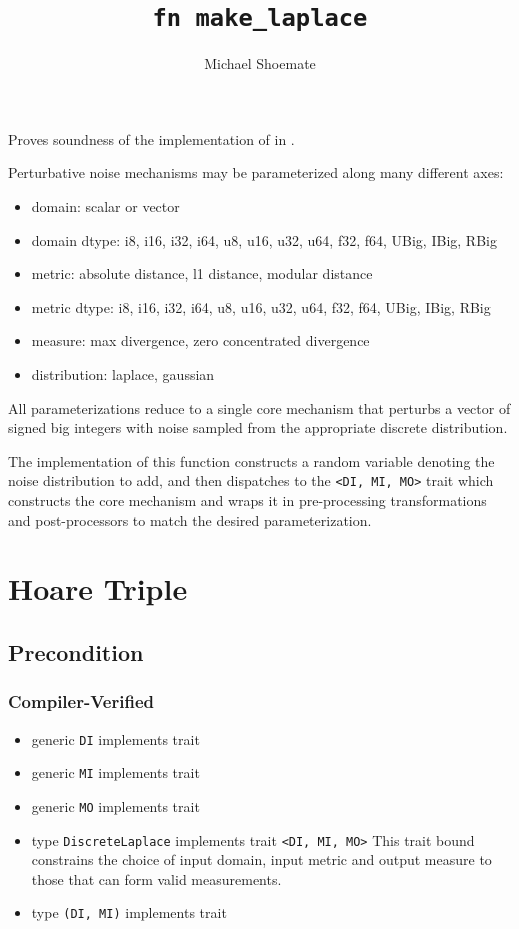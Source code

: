 \documentclass{article}
\title{\texttt{fn make\_laplace}}
\author{Michael Shoemate}
\date{}
\begin{document}
\maketitle

\contrib
Proves soundness of the implementation of  in .

Perturbative noise mechanisms may be parameterized along many different axes:
\begin{itemize}
    \item domain: scalar or vector
    \item domain dtype: i8, i16, i32, i64, u8, u16, u32, u64, f32, f64, UBig, IBig, RBig
    \item metric: absolute distance, l1 distance, modular distance
    \item metric dtype: i8, i16, i32, i64, u8, u16, u32, u64, f32, f64, UBig, IBig, RBig
    \item measure: max divergence, zero concentrated divergence
    \item distribution: laplace, gaussian
\end{itemize}

All parameterizations reduce to a single core mechanism that perturbs
a vector of signed big integers with noise sampled from the appropriate discrete distribution.

The implementation of this function constructs a random variable denoting the noise distribution to add, 
and then dispatches to the \texttt{<DI, MI, MO>} trait
which constructs the core mechanism and wraps it in pre-processing transformations and post-processors to match the desired parameterization.

\section{Hoare Triple}
\subsection*{Precondition}
\subsubsection*{Compiler-Verified}
\begin{itemize}
    \item generic \texttt{DI} implements trait 
    \item generic \texttt{MI} implements trait 
    \item generic \texttt{MO} implements trait 
    \item type \texttt{DiscreteLaplace} implements trait \texttt{<DI, MI, MO>}
        This trait bound constrains the choice of input domain, input metric and output measure to those that can form valid measurements.
    \item type \texttt{(DI, MI)} implements trait 
\end{itemize}
\end{document}
